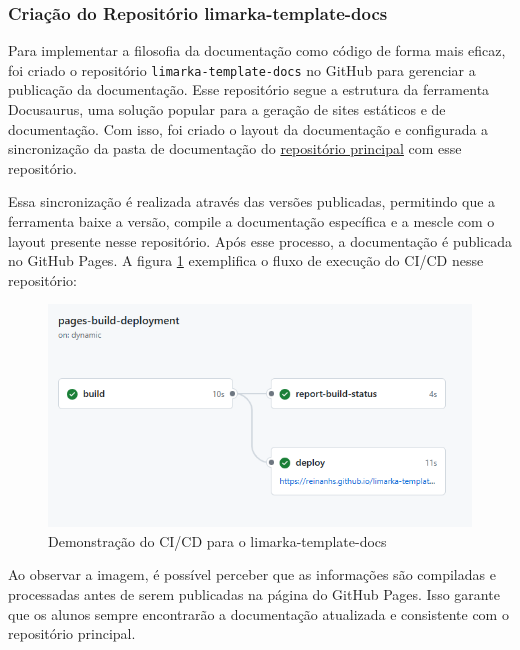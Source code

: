 \documentclass[
	12pt,				%
	oneside,			%
	a4paper,			%
	english,			%
	french,				%
	spanish,			%
	brazil				%
	]{abntex2}
\begin{document}
\hypertarget{criauxe7uxe3o-do-reposituxf3rio-limarka-template-docs}{%
\subsubsection{Criação do Repositório
limarka-template-docs}\label{criauxe7uxe3o-do-reposituxf3rio-limarka-template-docs}}

Para implementar a filosofia da documentação como código de forma mais
eficaz, foi criado o repositório \texttt{limarka-template-docs} no
GitHub para gerenciar a publicação da documentação. Esse repositório
segue a estrutura da ferramenta Docusaurus, uma solução popular para a
geração de sites estáticos e de documentação. Com isso, foi criado o
layout da documentação e configurada a sincronização da pasta de
documentação do
\href{https://github.com/ReinanHS/limarka-template-tcc}{repositório
principal} com esse repositório.

Essa sincronização é realizada através das versões publicadas,
permitindo que a ferramenta baixe a versão, compile a documentação
específica e a mescle com o layout presente nesse repositório. Após esse
processo, a documentação é publicada no GitHub Pages. A figura
\ref{limarka_template_docs_ci_cd} exemplifica o fluxo de execução do
CI/CD nesse repositório:

\begin{figure}[htbp]
\hypertarget{limarka_template_docs_ci_cd}{%
\caption{Demonstração do CI/CD para o limarka-template-docs}\label{limarka_template_docs_ci_cd}
\begin{center}
\includegraphics[scale=0.6]{imagens/screenshot/limarka-template-docs-ci-cd.png}
\end{center}
}
\end{figure}

Ao observar a imagem, é possível perceber que as informações são
compiladas e processadas antes de serem publicadas na página do GitHub
Pages. Isso garante que os alunos sempre encontrarão a documentação
atualizada e consistente com o repositório principal.
\end{document}
